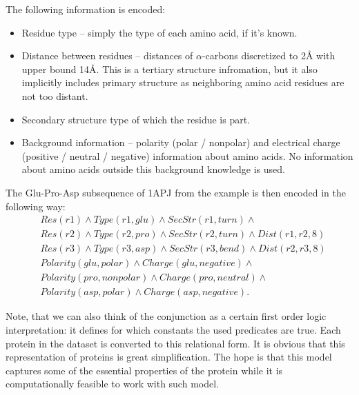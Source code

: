 \documentclass[11pt,twoside,a4paper]{book}
\begin{document}
The following information is encoded:
\begin{itemize}
 \item Residue type -- simply the type of each amino acid, if it's known.
 \item Distance between residues -- distances of $\alpha$-carbons discretized to 2Å with upper bound 14Å.
 This is a tertiary structure infromation, but it also implicitly includes primary structure 
 as neighboring amino acid residues are not too distant.
 \item Secondary structure type of which the residue is part.
 \item Background information -- polarity (polar / nonpolar) and electrical charge (positive / neutral / negative)
 information about amino acids.
 No information about amino acids outside this background knowledge is used.
\end{itemize}

The Glu-Pro-Asp subsequence of 1APJ from the example is then encoded in the following way:
\begin{align*}
&Res(r1) \land Type(r1, glu) \land SecStr(r1, turn) \land \\
&Res(r2) \land Type(r2, pro) \land SecStr(r2, turn) \land Dist(r1, r2, 8) \\
&Res(r3) \land Type(r3, asp) \land SecStr(r3, bend) \land Dist(r2, r3, 8) \\
&Polarity(glu, polar) \land Charge(glu, negative) \land \\
&Polarity(pro, nonpolar) \land Charge(pro, neutral) \land \\
&Polarity(asp, polar) \land Charge(asp, negative).
\end{align*}

Note, that we can also think of the conjunction as a certain first order logic interpretation:
it defines for which constants the used predicates are true.
Each protein in the dataset is converted to this relational form.
It is obvious that this representation of proteins is great simplification.
The hope is that this model captures some of the essential properties of the 
protein while it is computationally feasible to work with such model.
\end{document}
